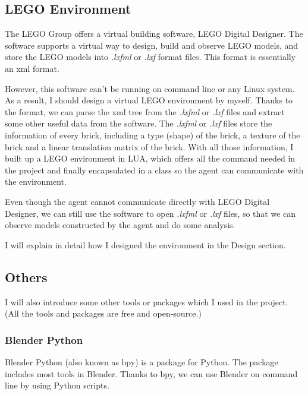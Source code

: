 \documentclass[a4paper]{article}
\begin{document}
            
            
        
        \subsection{LEGO Environment}
        
            The LEGO Group offers a virtual building software, LEGO Digital Designer.\cite{ldd} The software supports a virtual way to design, build and observe LEGO models, and store the LEGO models into \textit{.lxfml} or \textit{.lxf} format files. This format is essentially an xml format. 
            
            However, this software can't be running on command line or any Linux system. As a result, I should design a virtual LEGO environment by myself. Thanks to the format, we can parse the xml tree from the \textit{.lxfml} or \textit{.lxf} files and extract some other useful data from the software. The \textit{.lxfml} or \textit{.lxf} files store the information of every brick, including a type (shape) of the brick, a texture of the brick and a linear translation matrix of the brick. With all those information, I built up a LEGO environment in LUA, which offers all the command needed in the project and finally encapsulated in a class so the agent can communicate with the environment.
            
            Even though the agent cannot communicate directly with LEGO Digital Designer, we can still use the software to open \textit{.lxfml} or \textit{.lxf} files, so that we can observe models constructed by the agent and do some analysis. 
            
            I will explain in detail how I designed the environment in the Design section.
        
        \subsection{Others}
            I will also introduce some other tools or packages which I used in the project.
            (All the tools and packages are free and open-source.)
            
            \subsubsection{Blender Python}
                Blender Python (also known as bpy) is a package for Python. The package includes most tools in Blender. Thanks to bpy, we can use Blender on command line by using Python scripts. 
                
\end{document}
